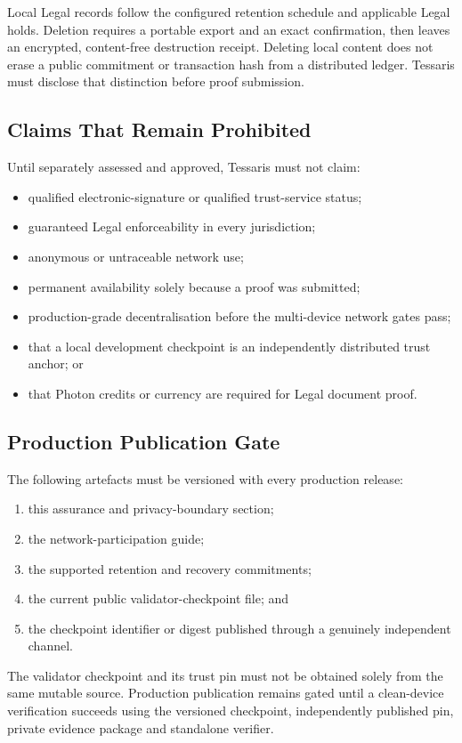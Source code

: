Local Legal records follow the configured retention schedule and applicable
Legal holds.  Deletion requires a portable export and an exact confirmation,
then leaves an encrypted, content-free destruction receipt.  Deleting local
content does not erase a public commitment or transaction hash from a
distributed ledger.  Tessaris must disclose that distinction before proof
submission.

\subsection{Claims That Remain Prohibited}

Until separately assessed and approved, Tessaris must not claim:

\begin{itemize}[leftmargin=*]
  \item qualified electronic-signature or qualified trust-service status;
  \item guaranteed Legal enforceability in every jurisdiction;
  \item anonymous or untraceable network use;
  \item permanent availability solely because a proof was submitted;
  \item production-grade decentralisation before the multi-device network
        gates pass;
  \item that a local development checkpoint is an independently distributed
        trust anchor; or
  \item that Photon credits or currency are required for Legal document proof.
\end{itemize}

\subsection{Production Publication Gate}

The following artefacts must be versioned with every production release:

\begin{enumerate}[leftmargin=*]
  \item this assurance and privacy-boundary section;
  \item the network-participation guide;
  \item the supported retention and recovery commitments;
  \item the current public validator-checkpoint file; and
  \item the checkpoint identifier or digest published through a genuinely
        independent channel.
\end{enumerate}

The validator checkpoint and its trust pin must not be obtained solely from the
same mutable source.  Production publication remains gated until a clean-device
verification succeeds using the versioned checkpoint, independently published
pin, private evidence package and standalone verifier.
